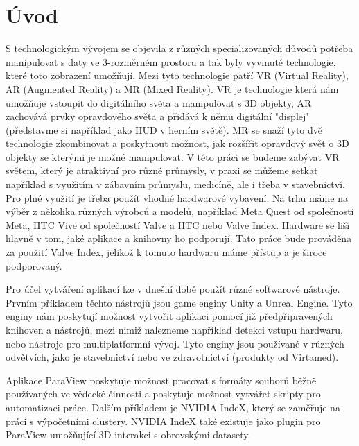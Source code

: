 \documentclass[a4paper,oneside,12pt]{book}
\begin{document}
\chapter*{Úvod} %
%
S technologickým vývojem se objevila z různých specializovaných důvodů potřeba manipulovat s daty ve 3-rozměrném prostoru a tak byly vyvinuté technologie, které toto zobrazení umožňují. Mezi tyto technologie patří VR (Virtual Reality), AR (Augmented Reality) a MR (Mixed Reality). VR je technologie která nám umožňuje vstoupit do digitálního světa a manipulovat s 3D objekty, AR zachovává prvky opravdového světa a přidává k němu digitální "displej" (představme si například jako HUD v herním světě). MR se snaží tyto dvě technologie zkombinovat a poskytnout možnost, jak rozšířit opravdový svět o 3D objekty se kterými je možné manipulovat. V této práci se budeme zabývat VR světem, který je atraktivní pro různé průmysly, v praxi se můžeme setkat například s využitím v zábavním průmyslu, medicíně\cite{virtamed}, ale i třeba v stavebnictví\cite{unityvrstavebnictvi}. Pro plné využití je třeba použít vhodné hardwarové vybavení. Na trhu máme na výběr z několika různých výrobců a modelů, například Meta Quest\cite{metaquest} od společnosti Meta, HTC Vive\cite{htcvive} od společností Valve a HTC nebo Valve Index\cite{valveindex}. Hardware se liší hlavně v tom, jaké aplikace a knihovny ho podporují. Tato práce bude prováděna za použití Valve Index\cite{valveindex}, jelikož k tomuto hardwaru máme přístup a je široce podporovaný.

Pro účel vytváření aplikací lze v dnešní době použít různé softwarové nástroje. Prvním příkladem těchto nástrojů jsou game enginy Unity\cite{unityvr} a Unreal Engine\cite{unrealvr}. Tyto enginy nám poskytují možnost vytvořit aplikaci pomocí již předpřipravených knihoven a nástrojů, mezi nimiž nalezneme například detekci vstupu hardwaru\cite{unityvrdokovladani}, nebo nástroje pro multiplatformní vývoj\cite{unitymulti}. Tyto enginy jsou používané v různých odvětvích, jako je stavebnictví\cite{unityvrstavebnictvi} nebo ve zdravotnictví (produkty od Virtamed\cite{virtamed}).

Aplikace ParaView\cite{paraviewvrdok} poskytuje možnost pracovat s formáty souborů běžně používaných ve vědecké činnosti a poskytuje možnost vytvářet skripty pro automatizaci práce\cite{paraviewscript}. Dalším příkladem je NVIDIA IndeX, který se zaměřuje na práci s výpočetními clustery\cite{nvidiaindex}. NVIDIA IndeX také existuje jako plugin pro ParaView umožňující 3D interakci s obrovskými datasety\cite{nvidiaindexdok}.
\end{document}
